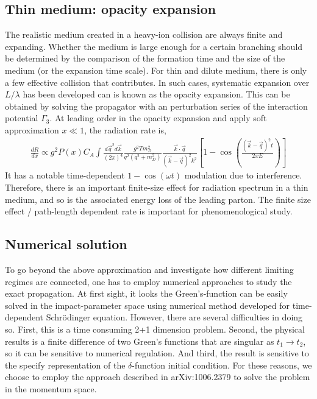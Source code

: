 \subsection{Thin medium: opacity expansion}
The realistic medium created in a heavy-ion collision are always finite and expanding.
Whether the medium is large enough for a certain branching should be determined by the comparison of the formation time and the size of the medium (or the expansion time scale).
For thin and dilute medium, there is only a few effective collision that contributes.
In such cases, systematic expansion over $L/\lambda$ has been developed can is known as the opacity expansion.
This can be obtained by solving the propagator with an perturbation series of the interaction potential $\Gamma_3$.
At leading order in the opacity expansion and apply soft approximation $x\ll 1$, the radiation rate is,
\begin{eqnarray}
\frac{dR}{dx} \propto g^2 P(x) C_A \int \frac{d\vec{q}^2 d\vec{k}}{(2\pi)^4} \frac{g^2 T m_D^2}{q^2(q^2 + m_D^2)} \frac{\vec{k}\cdot\vec{q}}{(\vec{k}-\vec{q})^2 k^2} \left[1-\cos\left(\frac{(\vec{k}-\vec{q})^2 t}{2x E}\right)\right]
\end{eqnarray}
It has a notable time-dependent $1-\cos(\omega t)$ modulation due to interference.
Therefore, there is an important finite-size effect for radiation spectrum in a thin medium, and so is the associated energy loss of the leading parton.
The finite size effect / path-length dependent rate is important for phenomenological study.

\subsection{Numerical solution}
To go beyond the above approximation and investigate how different limiting regimes are connected, one has to employ numerical approaches to study the exact propagation. 
At first sight, it looks the Green's-function can be easily solved in the impact-parameter space using numerical method developed for time-dependent  Schr\"odinger equation.
However, there are several difficulties in doing so.
First, this is a time consuming 2+1 dimension problem.
Second, the physical results is a finite difference of two Green's functions that are singular as $t_1 \rightarrow t_2$, so it can be sensitive to numerical regulation.
And third, the result is sensitive to the specify representation of the $\delta$-function initial condition.
For these reasons, we choose to employ the approach described in arXiv:1006.2379 to solve the problem in the momentum space.


